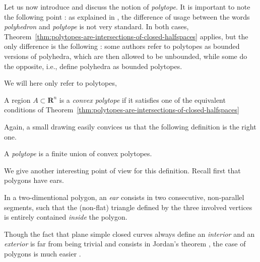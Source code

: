 \begin{remark}
    Let us now introduce and discuss the notion of \emph{polytope}. It is important to note the following point : as explained in \cite{boydvandenberghe2004}, the difference of usage between the words \og \emph{polyhedron} \fg and \og \emph{polytope} \fg is not very standard. In both cases, Theorem~\ref{thm:polytopes-are-intersections-of-closed-halfspaces} applies, but the only difference is the following : some authors refer to polytopes as bounded versions of polyhedra, which are then allowed to be unbounded, while some do the opposite, i.e., define polyhedra as bounded polytopes.

    We will here only refer to polytopes, 
\end{remark}

\begin{definition}
    A region $ A \subset \mathbf R^n $ is a \textit{convex polytope} if it satisfies one of the equivalent conditions of Theorem~\ref{thm:polytopes-are-intersections-of-closed-halfspaces}
\end{definition}

Again, a small drawing easily convices us that the following definition is the right one.

\begin{definition}[Polytope]\label{def:polytopes}
    A \textit{polytope} is a finite union of convex polytopes.
\end{definition}

We give another interesting point of view for this definition. Recall first that polygons have ears.

\begin{definition}
    In a two-dimentional polygon, an \textit{ear} consists in two consecutive, non-parallel segments, such that the (non-flat) triangle defined by the three involved vertices is entirely contained \textit{inside} the polygon. 
\end{definition}

\begin{remark}
    Though the fact that plane simple closed curves always define an \textit{interior} and an \textit{exterior} is far from being trivial and consists in Jordan's theorem \cite{jordan1893}, the case of polygons is much easier \cite{courant1941}.
\end{remark}


